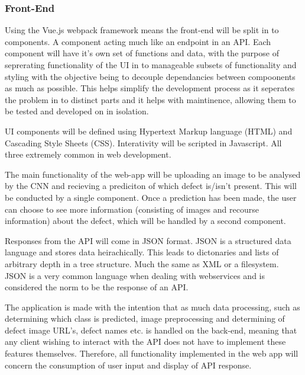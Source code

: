     \subsubsection{Front-End}
      Using the Vue.js webpack framework means the front-end will be split in to components. A component acting much like an endpoint in an API. Each component will have it's own set of functions and data, with the purpose of seprerating functionality of the UI in to manageable subsets of functionality and styling with the objective being to decouple dependancies between compoonents as much as possible. This helps simplify the development process as it seperates the problem in to distinct parts and it helps with maintinence, allowing them to be tested and developed on in isolation.
      \par
      UI components will be defined using Hypertext Markup language (HTML) and Cascading Style Sheets (CSS). Interativity will be scripted in Javascript. All three extremely common in web development. %
      \par
      The main functionality of the web-app will be uploading an image to be analysed by the CNN and recieving a prediciton of which defect is/isn't present. This will be conducted by a single component. Once a prediction has been made, the user can choose to see more information (consisting of images and recourse information) about the defect, which will be handled by a second component.
      \par
      Responses from the API will come in JSON format. JSON is a structured data language and stores data heirachically. This leads to dictonaries and lists of arbitrary depth in a tree structure. Much the same as XML or a filesystem. JSON is a very common language when dealing with webservices and is considered the norm to be the response of an API.
      \par
      The application is made with the intention that as much data processing, such as determining which class is predicted, image preprocessing and determining of defect image URL's, defect names etc. is handled on the back-end, meaning that any client wishing to interact with the API does not have to implement these features themselves. Therefore, all functionality implemented in the web app will concern the consumption of user input and display of API response.
      \par
